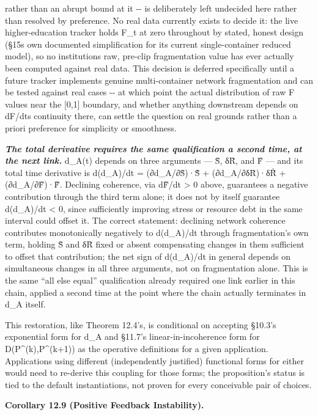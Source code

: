 \documentclass[
]{article}
\begin{document}
rather than an abrupt bound at it -\/- is deliberately left undecided
here rather than resolved by preference. No real data currently exists
to decide it: the live higher-education tracker holds F\_t at zero
throughout by stated, honest design (§15\textquotesingle s own
documented simplification for its current single-container reduced
model), so no institution\textquotesingle s raw, pre-clip fragmentation
value has ever actually been computed against real data. This decision
is deferred specifically until a future tracker implements genuine
multi-container network fragmentation and can be tested against real
cases -\/- at which point the actual distribution of raw F values near
the {[}0,1{]} boundary, and whether anything downstream depends on
dF/dt\textquotesingle s continuity there, can settle the question on
real grounds rather than a priori preference for simplicity or
smoothness.

\emph{\textbf{The total derivative requires the same qualification a
second time, at the next link.}} d\_A(t) depends on three arguments ---
S̃, δR̃, and F̃ --- and its total time derivative is d(d\_A)/dt =
(∂d\_A/∂S̃)·Ṡ̃ + (∂d\_A/∂δR̃)·δṘ̃ + (∂d\_A/∂F̃)·F̃̇. Declining coherence, via
dF̃/dt \textgreater{} 0 above, guarantees a negative contribution through
the third term alone; it does not by itself guarantee d(d\_A)/dt
\textless{} 0, since sufficiently improving stress or resource debt in
the same interval could offset it. The correct statement: declining
network coherence contributes monotonically negatively to d(d\_A)/dt
through fragmentation's own term, holding S̃ and δR̃ fixed or absent
compensating changes in them sufficient to offset that contribution; the
net sign of d(d\_A)/dt in general depends on simultaneous changes in all
three arguments, not on fragmentation alone. This is the same ``all else
equal'' qualification already required one link earlier in this chain,
applied a second time at the point where the chain actually terminates
in d\_A itself.

This restoration, like Theorem 12.4's, is conditional on accepting
§10.3's exponential form for d\_A and §11.7's linear-in-incoherence form
for D(P\^{}(k),P\^{}(k+1)) as the operative definitions for a given
application. Applications using different (independently justified)
functional forms for either would need to re-derive this coupling for
those forms; the proposition's status is tied to the default
instantiations, not proven for every conceivable pair of choices.

\textbf{Corollary 12.9 (Positive Feedback Instability).}
\end{document}
